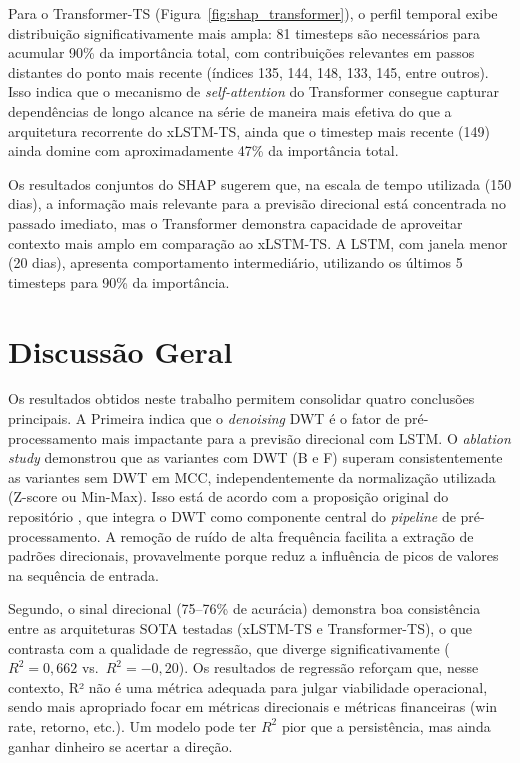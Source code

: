 Para o Transformer-TS (Figura~\ref{fig:shap_transformer}), o perfil temporal exibe distribuição significativamente mais ampla: 81 timesteps são necessários para acumular 90\% da importância total, com contribuições relevantes em passos distantes do ponto mais recente (índices 135, 144, 148, 133, 145, entre outros). Isso indica que o mecanismo de \textit{self-attention} do Transformer consegue capturar dependências de longo alcance na série de maneira mais efetiva do que a arquitetura recorrente do xLSTM-TS, ainda que o timestep mais recente (149) ainda domine com aproximadamente 47\% da importância total.

Os resultados conjuntos do SHAP sugerem que, na escala de tempo utilizada (150 dias), a informação mais relevante para a previsão direcional está concentrada no passado imediato, mas o Transformer demonstra capacidade de aproveitar contexto mais amplo em comparação ao xLSTM-TS. A LSTM, com janela menor (20 dias), apresenta comportamento intermediário, utilizando os últimos 5 timesteps para 90\% da importância.

\section{Discussão Geral}
\label{sec:disc_geral}

Os resultados obtidos neste trabalho permitem consolidar quatro conclusões principais. A Primeira indica que o \textit{denoising} DWT é o fator de pré-processamento mais impactante para a previsão direcional com LSTM. O \textit{ablation study} demonstrou que as variantes com DWT (B e F) superam consistentemente as variantes sem DWT em MCC, independentemente da normalização utilizada (Z-score ou Min-Max). Isso está de acordo com a proposição original do repositório , que integra o DWT como componente central do \textit{pipeline} de pré-processamento. A remoção de ruído de alta frequência facilita a extração de padrões direcionais, provavelmente porque reduz a influência de picos de valores na sequência de entrada.

Segundo, o sinal direcional (75--76\% de acurácia) demonstra boa consistência entre as arquiteturas SOTA testadas (xLSTM-TS e Transformer-TS), o que contrasta com a qualidade de regressão, que diverge significativamente ($R^2 = 0{,}662$ vs.\ $R^2 = -0{,}20$). Os resultados de regressão reforçam que, nesse contexto, R² não é uma métrica adequada para julgar viabilidade operacional, sendo mais apropriado focar em métricas direcionais e métricas financeiras (win rate, retorno, etc.). Um modelo pode ter $R^2$ pior que a persistência, mas ainda ganhar dinheiro se acertar a direção.

